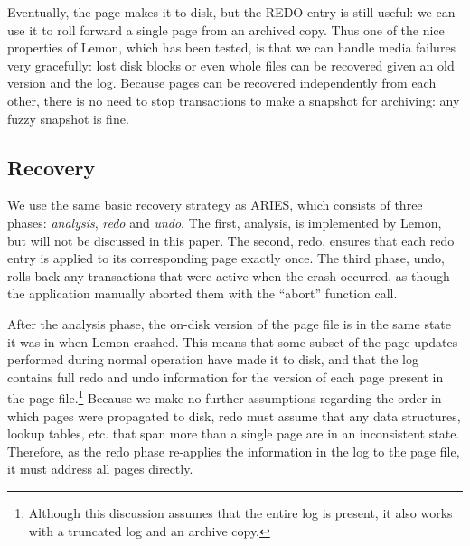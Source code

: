 \documentclass[letterpaper,twocolumn,english]{article}
\newcommand{\yad}{Lemon\xspace}
\begin{document}

Eventually, the page makes it to disk, but the REDO entry is still
useful: we can use it to roll forward a single page from an archived
copy.  Thus one of the nice properties of \yad, which has been tested,
is that we can handle media failures very gracefully: lost disk blocks
or even whole files can be recovered given an old version and the log.
Because pages can be recovered independently from each other, there is
no need to stop transactions to make a snapshot for archiving: any
fuzzy snapshot is fine.

\subsection{Recovery}

%

We use the same basic recovery strategy as ARIES, which consists of
three phases: {\em analysis}, {\em redo} and {\em undo}.  The first,
analysis, is implemented by \yad, but will not be discussed in this
paper. The second, redo, ensures that each redo entry is applied to its corresponding page exactly once.  The
third phase, undo, rolls back any transactions that were active when
the crash occurred, as though the application manually aborted them
with the ``abort'' function call.
  
After the analysis phase, the on-disk version of the page file is in
the same state it was in when \yad crashed. This means that some
subset of the page updates performed during normal operation have made
it to disk, and that the log contains full redo and undo information
for the version of each page present in the page
file.\footnote{Although this discussion assumes that the entire log is
present, it also works with a truncated log and an archive copy.}
Because we make no further assumptions regarding the order in which
pages were propagated to disk, redo must assume that any data
structures, lookup tables, etc. that span more than a single page are
in an inconsistent state. Therefore, as the redo phase re-applies the
information in the log to the page file, it must address all pages
directly.
\end{document}
